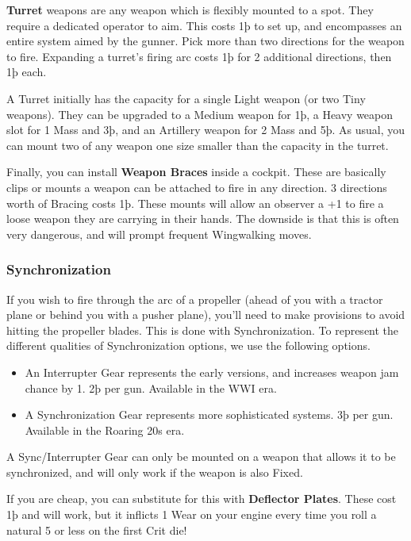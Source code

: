 \documentclass{article}
\begin{document}
\textbf{Turret}{ weapons are any weapon which is flexibly
    mounted to a spot. They require a dedicated operator to aim. This costs
    1þ to set up, and encompasses an entire system aimed by the gunner. Pick
    more than two directions for the weapon to fire. Expanding a turret's
    firing arc costs 1þ for 2 additional directions, then 1þ each.}

A Turret initially has the capacity for a single Light weapon (or
two Tiny weapons). They can be upgraded to a Medium weapon for 1þ, a
Heavy weapon slot for 1 Mass and 3þ, and an Artillery weapon for 2 Mass
and 5þ. As usual, you can mount two of any weapon one size smaller than
the capacity in the turret.

Finally, you can install \textbf{Weapon Braces}
inside a cockpit. These are basically clips or mounts a weapon can be
attached to fire in any direction. 3 directions worth of Bracing costs
1þ. These mounts will allow an observer a +1 to fire a loose weapon they
are carrying in their hands. The downside is that this is often very
dangerous, and will prompt frequent Wingwalking moves.

\subsubsection{Synchronization}
\label{_Synchronization}

If you wish to fire through the arc of a propeller (ahead of you with a
tractor plane or behind you with a pusher plane), you'll need to make
provisions to avoid hitting the propeller blades. This is done with
Synchronization. To represent the different qualities of Synchronization
options, we use the following options.

\begin{itemize}
    \item          An Interrupter Gear represents the early versions, and
          increases weapon jam chance by 1. 2þ per gun. Available in the WWI
          era.
    \item          A Synchronization Gear represents more sophisticated systems.
          3þ per gun. Available in the Roaring 20s era.
\end{itemize}

A Sync/Interrupter Gear can only be mounted on a weapon that allows it
to be synchronized, and will only work if the weapon is also Fixed.

If you are cheap, you can substitute for this with \textbf{Deflector
    Plates}. These cost 1þ and will work, but it inflicts 1 Wear on your
engine every time you roll a natural 5 or less on the first Crit die!
\end{document}
